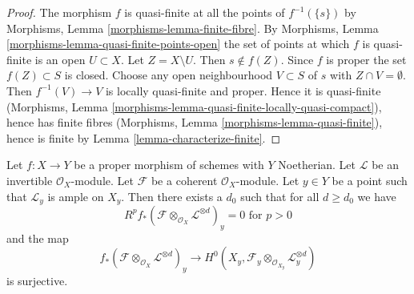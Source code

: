 \begin{proof}
The morphism $f$ is quasi-finite at all the points of $f^{-1}(\{s\})$
by Morphisms, Lemma \ref{morphisms-lemma-finite-fibre}.
By Morphisms, Lemma \ref{morphisms-lemma-quasi-finite-points-open} the
set of points at which $f$ is quasi-finite is an open $U \subset X$.
Let $Z = X \setminus U$. Then $s \not \in f(Z)$. Since $f$ is proper
the set $f(Z) \subset S$ is closed. Choose any open neighbourhood
$V \subset S$ of $s$ with $Z \cap V = \emptyset$. Then
$f^{-1}(V) \to V$ is locally quasi-finite and proper.
Hence it is quasi-finite
(Morphisms, Lemma \ref{morphisms-lemma-quasi-finite-locally-quasi-compact}),
hence has finite fibres
(Morphisms, Lemma \ref{morphisms-lemma-quasi-finite}), hence
is finite by Lemma \ref{lemma-characterize-finite}.
\end{proof}

\begin{lemma}
\label{lemma-ample-on-fibre}
Let $f : X \to Y$ be a proper morphism of schemes with $Y$ Noetherian.
Let $\mathcal{L}$ be an invertible $\mathcal{O}_X$-module.
Let $\mathcal{F}$ be a coherent $\mathcal{O}_X$-module.
Let $y \in Y$ be a point such that $\mathcal{L}_y$ is ample on $X_y$.
Then there exists a $d_0$ such that for all $d \geq d_0$ we have
$$
R^pf_*(\mathcal{F} \otimes_{\mathcal{O}_X} \mathcal{L}^{\otimes d})_y = 0
\text{ for }p > 0
$$
and the map
$$
f_*(\mathcal{F} \otimes_{\mathcal{O}_X} \mathcal{L}^{\otimes d})_y
\longrightarrow
H^0(X_y, \mathcal{F}_y \otimes_{\mathcal{O}_{X_y}} \mathcal{L}_y^{\otimes d})
$$
is surjective.
\end{lemma}

